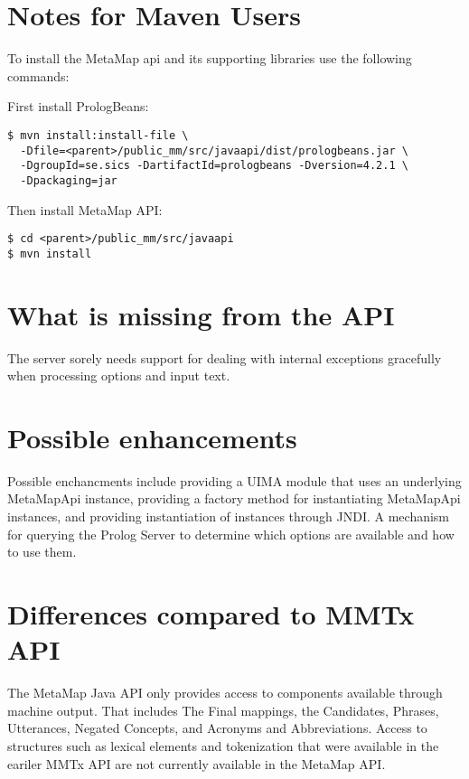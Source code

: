 \documentclass[11pt]{article}
\begin{document}
\section{Notes for Maven Users}
\label{Notes for Maven Users}

To install the MetaMap api and its supporting libraries use the following commands:


First install PrologBeans:

\begin{verbatim}
$ mvn install:install-file \
  -Dfile=<parent>/public_mm/src/javaapi/dist/prologbeans.jar \
  -DgroupId=se.sics -DartifactId=prologbeans -Dversion=4.2.1 \
  -Dpackaging=jar
\end{verbatim}

Then install MetaMap API:

\begin{verbatim}
$ cd <parent>/public_mm/src/javaapi
$ mvn install
\end{verbatim}

\section{What is missing from the API}
\label{What is missing from the API}

The server sorely needs support for dealing with internal exceptions
gracefully when processing options and input text.


\section{Possible enhancements}
\label{Possible enhancements}

Possible enchancments include providing a UIMA module that uses an
underlying MetaMapApi instance, providing a factory method for
instantiating MetaMapApi instances, and providing instantiation of
instances through JNDI. A mechanism for querying the Prolog Server to
determine which options are available and how to use them.


\section{Differences compared to MMTx API}
\label{Differences compared to MMTx API}

The MetaMap Java API only provides access to components available
through machine output.  That includes The Final mappings, the
Candidates, Phrases, Utterances, Negated Concepts, and Acronyms and
Abbreviations.  Access to structures such as lexical elements and
tokenization that were available in the eariler MMTx API are not
currently available in the MetaMap API.
\end{document}

